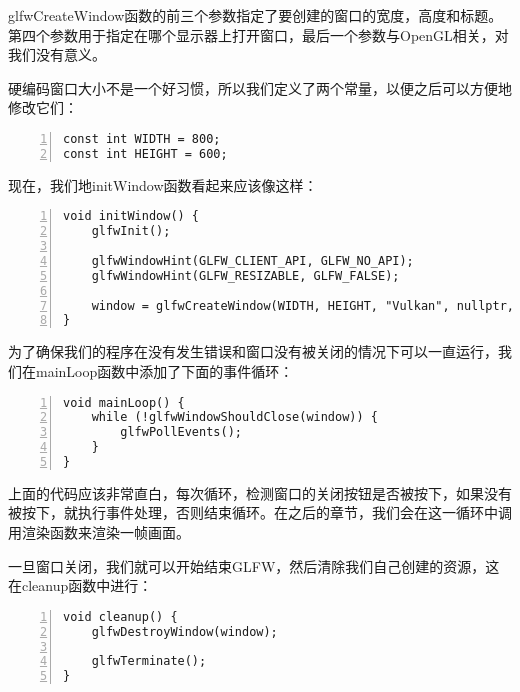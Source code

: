 \documentclass{ctexart}
\begin{document}
glfwCreateWindow函数的前三个参数指定了要创建的窗口的宽度，高度和标题。第四个参数用于指定在哪个显示器上打开窗口，最后一个参数与OpenGL相关，对我们没有意义。

硬编码窗口大小不是一个好习惯，所以我们定义了两个常量，以便之后可以方便地修改它们：

\begin{lstlisting}[language={[ANSI]C},keywordstyle=\color{blue!70},commentstyle=\color{red!50!green!50!blue!50},frame=shadowbox, rulesepcolor=\color{red!20!green!20!blue!20},basicstyle=\small,numbers=left, numberstyle=\tiny,breaklines=true]
const int WIDTH = 800;
const int HEIGHT = 600;
\end{lstlisting}

现在，我们地initWindow函数看起来应该像这样：

\begin{lstlisting}[language={[ANSI]C},keywordstyle=\color{blue!70},commentstyle=\color{red!50!green!50!blue!50},frame=shadowbox, rulesepcolor=\color{red!20!green!20!blue!20},basicstyle=\small,numbers=left, numberstyle=\tiny,breaklines=true]
void initWindow() {
	glfwInit();

	glfwWindowHint(GLFW_CLIENT_API, GLFW_NO_API);
	glfwWindowHint(GLFW_RESIZABLE, GLFW_FALSE);

	window = glfwCreateWindow(WIDTH, HEIGHT, "Vulkan", nullptr, nullptr);
}
\end{lstlisting}

为了确保我们的程序在没有发生错误和窗口没有被关闭的情况下可以一直运行，我们在mainLoop函数中添加了下面的事件循环：

\begin{lstlisting}[language={[ANSI]C},keywordstyle=\color{blue!70},commentstyle=\color{red!50!green!50!blue!50},frame=shadowbox, rulesepcolor=\color{red!20!green!20!blue!20},basicstyle=\small,numbers=left, numberstyle=\tiny,breaklines=true]
void mainLoop() {
	while (!glfwWindowShouldClose(window)) {
		glfwPollEvents();
	}
}
\end{lstlisting}

上面的代码应该非常直白，每次循环，检测窗口的关闭按钮是否被按下，如果没有被按下，就执行事件处理，否则结束循环。在之后的章节，我们会在这一循环中调用渲染函数来渲染一帧画面。

一旦窗口关闭，我们就可以开始结束GLFW，然后清除我们自己创建的资源，这在cleanup函数中进行：

\begin{lstlisting}[language={[ANSI]C},keywordstyle=\color{blue!70},commentstyle=\color{red!50!green!50!blue!50},frame=shadowbox, rulesepcolor=\color{red!20!green!20!blue!20},basicstyle=\small,numbers=left, numberstyle=\tiny,breaklines=true]
void cleanup() {
	glfwDestroyWindow(window);

	glfwTerminate();
}
\end{lstlisting}
\end{document}
